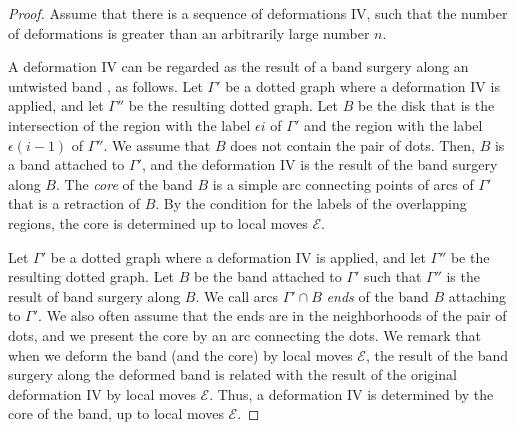 \documentclass[a4paper,11pt]{amsart}
\numberwithin{equation}{section}
\begin{document}
\begin{proof}
Assume that there is a sequence of deformations IV, such that the number of deformations is greater than an arbitrarily large number $n$. 
 
 

A deformation IV can be regarded as the result of a band surgery along an untwisted band \cite{Kawauchi}, as follows. 
Let $\Gamma'$ be a dotted graph where a deformation IV is applied, and let $\Gamma''$ be the resulting dotted graph. Let $B$ be the disk that is the intersection of the region with the label $\epsilon i$ of $\Gamma'$ and the region with the label $\epsilon (i-1)$ of $\Gamma''$. We assume that $B$ does not contain the pair of dots. Then, $B$ is a band attached to $\Gamma'$, and the deformation IV is the result of the band surgery along $B$. The {\it core} of the band $B$ is a simple arc connecting points of arcs of $\Gamma'$ that is a retraction of $B$. 
By the condition for the labels of the overlapping regions, the core is determined up to local moves $\mathcal{E}$. 

Let $\Gamma'$ be a dotted graph where a deformation IV is applied, and let $\Gamma''$ be the resulting dotted graph. Let $B$ be the band attached to $\Gamma'$ such that $\Gamma''$ is the result of band surgery along $B$.  
We call arcs $\Gamma' \cap B$ {\it ends} of the band $B$ attaching to $\Gamma'$. We also often assume that the ends are in the neighborhoods of the pair of dots, and we present the core by an arc connecting the dots. We remark that when we deform the band (and the core) by local moves $\mathcal{E}$, the result of the band surgery along the deformed band is related with the result of the original  deformation IV by local moves $\mathcal{E}$. Thus, a deformation IV is determined by the core of the band, up to local moves $\mathcal{E}$. 




\end{proof}
\end{document}
